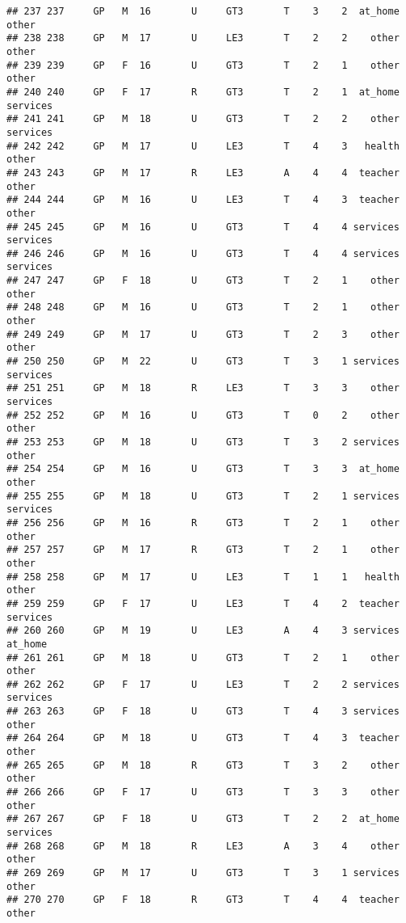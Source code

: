 \documentclass[]{article}
\begin{document}
\begin{verbatim}
## 237 237     GP   M  16       U     GT3       T    3    2  at_home    other
## 238 238     GP   M  17       U     LE3       T    2    2    other    other
## 239 239     GP   F  16       U     GT3       T    2    1    other    other
## 240 240     GP   F  17       R     GT3       T    2    1  at_home services
## 241 241     GP   M  18       U     GT3       T    2    2    other services
## 242 242     GP   M  17       U     LE3       T    4    3   health    other
## 243 243     GP   M  17       R     LE3       A    4    4  teacher    other
## 244 244     GP   M  16       U     LE3       T    4    3  teacher    other
## 245 245     GP   M  16       U     GT3       T    4    4 services services
## 246 246     GP   M  16       U     GT3       T    4    4 services services
## 247 247     GP   F  18       U     GT3       T    2    1    other    other
## 248 248     GP   M  16       U     GT3       T    2    1    other    other
## 249 249     GP   M  17       U     GT3       T    2    3    other    other
## 250 250     GP   M  22       U     GT3       T    3    1 services services
## 251 251     GP   M  18       R     LE3       T    3    3    other services
## 252 252     GP   M  16       U     GT3       T    0    2    other    other
## 253 253     GP   M  18       U     GT3       T    3    2 services    other
## 254 254     GP   M  16       U     GT3       T    3    3  at_home    other
## 255 255     GP   M  18       U     GT3       T    2    1 services services
## 256 256     GP   M  16       R     GT3       T    2    1    other    other
## 257 257     GP   M  17       R     GT3       T    2    1    other    other
## 258 258     GP   M  17       U     LE3       T    1    1   health    other
## 259 259     GP   F  17       U     LE3       T    4    2  teacher services
## 260 260     GP   M  19       U     LE3       A    4    3 services  at_home
## 261 261     GP   M  18       U     GT3       T    2    1    other    other
## 262 262     GP   F  17       U     LE3       T    2    2 services services
## 263 263     GP   F  18       U     GT3       T    4    3 services    other
## 264 264     GP   M  18       U     GT3       T    4    3  teacher    other
## 265 265     GP   M  18       R     GT3       T    3    2    other    other
## 266 266     GP   F  17       U     GT3       T    3    3    other    other
## 267 267     GP   F  18       U     GT3       T    2    2  at_home services
## 268 268     GP   M  18       R     LE3       A    3    4    other    other
## 269 269     GP   M  17       U     GT3       T    3    1 services    other
## 270 270     GP   F  18       R     GT3       T    4    4  teacher    other

\end{verbatim}
\end{document}
